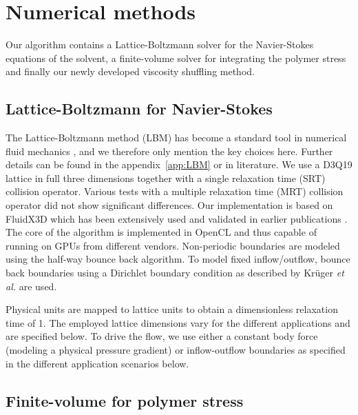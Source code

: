 \documentclass[a4paper,12pt]{scrartcl}
\begin{document}

\section{Numerical methods}
\label{sec:Methods}

Our algorithm contains a Lattice-Boltzmann solver for the Navier-Stokes equations of the solvent, a finite-volume solver for integrating the polymer stress and finally our newly developed viscosity shuffling method.

\subsection{Lattice-Boltzmann for Navier-Stokes}

The Lattice-Boltzmann method (LBM) has become a standard tool in numerical fluid mechanics \cite{Kruger_book}, and we therefore only mention the key choices here. Further details can be found in the appendix~\ref{app:LBM} or in literature.
We use a D3Q19 lattice in full three dimensions together with a single relaxation time (SRT) collision operator.
Various tests with a multiple relaxation time (MRT) collision operator did not show significant differences.
Our implementation is based on FluidX3D which has been extensively used and validated in earlier publications \cite{lehmann2021, Lehmann.20229da}.
The core of the algorithm is implemented in OpenCL and thus capable of running on GPUs from different vendors.
Non-periodic boundaries are modeled using the half-way bounce back algorithm. To model fixed inflow/outflow, bounce back boundaries using a Dirichlet boundary condition as described by Krüger \textit{et al.} \cite{Kruger_book} are used.

Physical units are mapped to lattice units to obtain a dimensionless relaxation time of 1.
The employed lattice dimensions vary for the different applications and are specified below.
To drive the flow, we use either a constant body force (modeling a physical pressure gradient) or inflow-outflow boundaries as specified in the different application scenarios below.

\subsection{Finite-volume for polymer stress }
\end{document}
